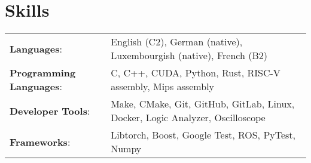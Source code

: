 \documentclass[a4paper,12pt]{article}
\begin{document}
\section{Skills}
\footnotesize{
\begin{tabularx}{\linewidth}{@{}l X@{}}
    \textbf{Languages}: & { English (C2), German (native), Luxembourgish (native), French (B2)} \\
    \textbf{Programming Languages}: & { C, C++, CUDA, Python, Rust, RISC-V assembly, Mips assembly} \\
    \textbf{Developer Tools}: & { Make, CMake, Git, GitHub, GitLab, Linux, Docker, Logic Analyzer, Oscilloscope} \\
    \textbf{Frameworks}: & { Libtorch, Boost, Google Test, ROS, PyTest, Numpy} \\
\end{tabularx}
}
\end{document}
